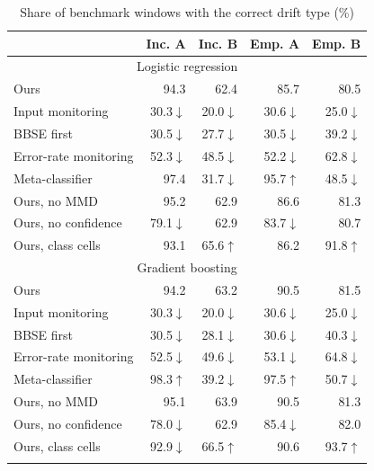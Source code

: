\documentclass[pdflatex,referee,lineno,sn-basic]{sn-jnl}
\begin{document}
\begin{table}[!htbp]\centering\tablebodyfont
\caption{Share of benchmark windows with the correct drift type (\%)}\label{tab:methods}%
\begin{tabular}{@{}lrrrr@{}}
\toprule
 & \multicolumn{1}{c}{Inc. A} & \multicolumn{1}{c}{Inc. B} & \multicolumn{1}{c}{Emp. A} & \multicolumn{1}{c}{Emp. B} \\
\midrule
\multicolumn{5}{c}{Logistic regression} \\
\midrule
Ours & 94.3 & 62.4 & 85.7 & 80.5 \\
Input monitoring & 30.3$\downarrow$ & 20.0$\downarrow$ & 30.6$\downarrow$ & 25.0$\downarrow$ \\
BBSE first & 30.5$\downarrow$ & 27.7$\downarrow$ & 30.5$\downarrow$ & 39.2$\downarrow$ \\
Error-rate monitoring & 52.3$\downarrow$ & 48.5$\downarrow$ & 52.2$\downarrow$ & 62.8$\downarrow$ \\
Meta-classifier & 97.4 & 31.7$\downarrow$ & 95.7$\uparrow$ & 48.5$\downarrow$ \\
\midrule
Ours, no MMD & 95.2 & 62.9 & 86.6 & 81.3 \\
Ours, no confidence & 79.1$\downarrow$ & 62.9 & 83.7$\downarrow$ & 80.7 \\
Ours, class cells & 93.1 & 65.6$\uparrow$ & 86.2 & 91.8$\uparrow$ \\
\midrule
\multicolumn{5}{c}{Gradient boosting} \\
\midrule
Ours & 94.2 & 63.2 & 90.5 & 81.5 \\
Input monitoring & 30.3$\downarrow$ & 20.0$\downarrow$ & 30.6$\downarrow$ & 25.0$\downarrow$ \\
BBSE first & 30.5$\downarrow$ & 28.1$\downarrow$ & 30.6$\downarrow$ & 40.3$\downarrow$ \\
Error-rate monitoring & 52.5$\downarrow$ & 49.6$\downarrow$ & 53.1$\downarrow$ & 64.8$\downarrow$ \\
Meta-classifier & 98.3$\uparrow$ & 39.2$\downarrow$ & 97.5$\uparrow$ & 50.7$\downarrow$ \\
\midrule
Ours, no MMD & 95.1 & 63.9 & 90.5 & 81.3 \\
Ours, no confidence & 78.0$\downarrow$ & 62.9 & 85.4$\downarrow$ & 82.0 \\
Ours, class cells & 92.9$\downarrow$ & 66.5$\uparrow$ & 90.6 & 93.7$\uparrow$ \\
\botrule
\end{tabular}
\end{table}
\end{document}
